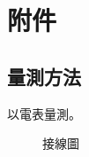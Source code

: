 
\chapter{附件}

\section{量測方法}

以電表量測。

\begin{figure}[htbp]
  \centering
  
  \caption{接線圖}
  \label{fig:wiring}
\end{figure}
